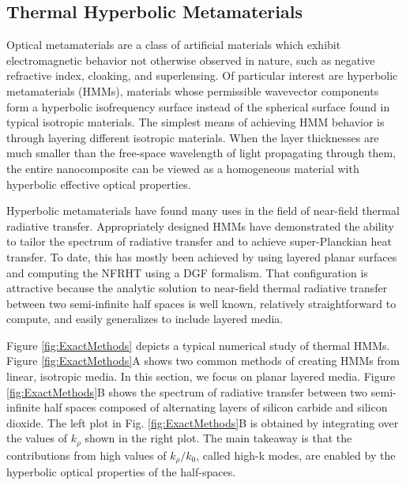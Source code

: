 \subsection{Thermal Hyperbolic Metamaterials}
%
Optical metamaterials are a class of artificial materials which exhibit electromagnetic behavior not otherwise observed in nature, such as negative refractive index,\cite{Smith2004, Zhang2005, Soukoulis2007, Valentine2008} cloaking, \cite{Alu2005, Schurig2006, Cai2007, Valentine2009} and superlensing.\cite{Pendry2000, Fang2005, Smolyaninov2007, Zhang2008} Of particular interest are hyperbolic metamaterials (HMMs), materials whose permissible wavevector components form a hyperbolic isofrequency surface instead of the spherical surface found in typical isotropic materials. The simplest means of achieving HMM behavior is through layering different isotropic materials. When the layer thicknesses are much smaller than the free-space wavelength of light propagating through them, the entire nanocomposite can be viewed as a homogeneous material with hyperbolic effective optical properties.\cite{Halevi1999, Smith2003}

Hyperbolic metamaterials have found many uses in the field of near-field thermal radiative transfer. Appropriately designed HMMs have demonstrated the ability to tailor the spectrum of radiative transfer and to achieve super-Planckian heat transfer.\cite{Francoeur2011, Liu2011, Mason2011, Biehs2012, Guo2012, Guo2013, Liu2013} To date, this has mostly been achieved by using layered planar surfaces and computing the NFRHT using a DGF formalism.\cite{Biehs2007, Fu2009, Svetovoy2012} That configuration is attractive because the analytic solution to near-field thermal radiative transfer between two semi-infinite half spaces is well known, relatively straightforward to compute, and easily generalizes to include layered media.\cite{Polder1971, Francoeur2008, Francoeur2009, Song2016}

Figure \ref{fig:ExactMethods} depicts a typical numerical study of thermal HMMs.\cite{Guo2012a, Guo2013} Figure \ref{fig:ExactMethods}A shows two common methods of creating HMMs from linear, isotropic media. In this section, we focus on planar layered media. Figure \ref{fig:ExactMethods}B shows the spectrum of radiative transfer between two semi-infinite half spaces composed of alternating layers of silicon carbide and silicon dioxide. The left plot in Fig. \ref{fig:ExactMethods}B is obtained by integrating over the values of $k_{\rho}$ shown in the right plot. The main takeaway is that the contributions from high values of $k_{\rho}/k_{0}$, called high-k modes, are enabled by the hyperbolic optical properties of the half-spaces. 

